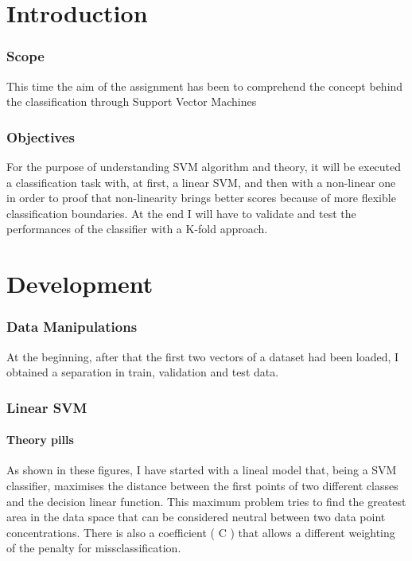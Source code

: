 \documentclass{article}
\begin{document}
			\renewcommand{\lstlistingname}{Code}

			
			\part{Introduction}
			
				\section{Scope}
This time the aim of the assignment has been to comprehend the concept behind the classification through Support Vector Machines
				\section{Objectives}
				
				For the purpose of understanding SVM algorithm and theory, it will be executed a classification task with, at first, a linear SVM, and then with a non-linear one in order to proof that non-linearity brings better scores because of more flexible classification boundaries. At the end I will have to validate and test the performances of the classifier with a K-fold approach.

\newpage
			\part{Development}
				\section{Data Manipulations}
	At the beginning, after that the first two vectors of a dataset had been loaded, I obtained a separation in train, validation and test data.	
	
	

				\section{Linear SVM}
				\subsection{Theory pills}
				As shown in these figures, I have started with a lineal model that, being a SVM classifier, maximises the distance between the first points of two different classes and the decision linear function.
				This maximum problem tries to find the greatest area in the data space that can be considered neutral between two data point concentrations. There is also a coefficient ( C ) that allows a different weighting of the penalty for missclassification.
				
\end{document}
